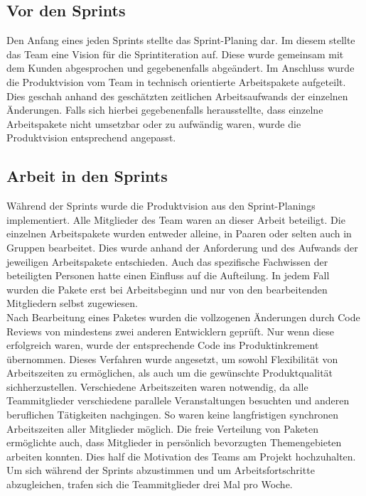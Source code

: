\documentclass[10pt, a4paper]{article}
\begin{document}
\begin{onehalfspace}
  \subsection{Vor den Sprints}
  Den Anfang eines jeden Sprints stellte das Sprint-Planing dar.
  Im diesem stellte das Team eine Vision für die Sprintiteration auf.
  Diese wurde gemeinsam mit dem Kunden abgesprochen und gegebenenfalls abgeändert.
  Im Anschluss wurde die Produktvision vom Team in technisch orientierte Arbeitspakete aufgeteilt.
  Dies geschah anhand des geschätzten zeitlichen Arbeitsaufwands der einzelnen Änderungen.
  Falls sich hierbei gegebenenfalls herausstellte, dass einzelne Arbeitspakete nicht umsetzbar oder zu aufwändig waren, wurde die Produktvision entsprechend angepasst.


  \subsection{Arbeit in den Sprints}
  Während der Sprints wurde die Produktvision aus den Sprint-Planings implementiert.
  Alle Mitglieder des Team waren an dieser Arbeit beteiligt.
  Die einzelnen Arbeitspakete wurden entweder alleine, in Paaren oder selten auch in Gruppen bearbeitet.
  Dies wurde anhand der Anforderung und des Aufwands der jeweiligen Arbeitspakete entschieden.
  Auch das spezifische Fachwissen der beteiligten Personen hatte einen Einfluss auf die Aufteilung.
  In jedem Fall wurden die Pakete erst bei Arbeitsbeginn und nur von den bearbeitenden Mitgliedern selbst zugewiesen.
  \\
  Nach Bearbeitung eines Paketes wurden die vollzogenen Änderungen durch Code Reviews von mindestens zwei anderen Entwicklern geprüft.
  Nur wenn diese erfolgreich waren, wurde der entsprechende Code ins Produktinkrement übernommen.
  Dieses Verfahren wurde angesetzt, um sowohl Flexibilität von Arbeitszeiten zu ermöglichen, als auch um die gewünschte Produktqualität sichherzustellen.
  Verschiedene Arbeitszeiten waren notwendig, da alle Teammitglieder verschiedene parallele Veranstaltungen besuchten und anderen beruflichen Tätigkeiten nachgingen.
  So waren keine langfristigen synchronen Arbeitszeiten aller Mitglieder möglich.
  Die freie Verteilung von Paketen ermöglichte auch, dass Mitglieder in persönlich bevorzugten Themengebieten arbeiten konnten.
  Dies half die Motivation des Teams am Projekt hochzuhalten.
  \\
  Um sich während der Sprints abzustimmen und um Arbeitsfortschritte abzugleichen, trafen sich die Teammitglieder drei Mal pro Woche.

\end{onehalfspace}
\end{document}
